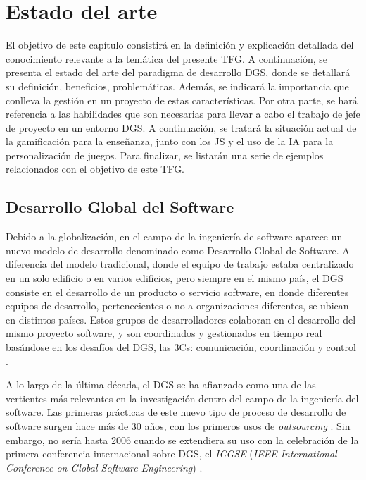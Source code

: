 \chapter{Estado del arte}
\label{cap:Antecedentes}

El objetivo de este capítulo consistirá en la definición y explicación detallada del conocimiento relevante a la temática del presente TFG. A continuación, se presenta el estado del arte del paradigma de desarrollo DGS, donde se detallará su definición, beneficios, problemáticas. Además, se indicará la importancia que conlleva la gestión en un proyecto de estas características. Por otra parte, se hará referencia a las habilidades que son necesarias para llevar a cabo el trabajo de jefe de proyecto en un entorno DGS. A continuación, se tratará la situación actual de la gamificación para la enseñanza, junto con los JS y el uso de la IA para la personalización de juegos. Para finalizar, se listarán una serie de ejemplos relacionados con el objetivo de este TFG.

\section{Desarrollo Global del Software}
\label{sec:DGS}

Debido a la globalización, en el campo de la ingeniería de software aparece un nuevo modelo de desarrollo denominado como Desarrollo Global de Software. A diferencia del modelo tradicional, donde el equipo de trabajo estaba centralizado en un solo edificio o en varios edificios, pero siempre en el mismo país, el DGS consiste en el desarrollo de un producto o servicio software, en donde diferentes equipos de desarrollo, pertenecientes o no a organizaciones diferentes, se ubican en distintos países. Estos grupos de desarrolladores colaboran en el desarrollo del mismo proyecto software, y son coordinados y gestionados en tiempo real basándose en los desafíos del DGS, las 3Cs: comunicación, coordinación y control \cite{piattini2014desarrollo}.

A lo largo de la última década, el DGS se ha afianzado como una de las vertientes más relevantes en la investigación dentro del campo de la ingeniería del software. Las primeras prácticas de este nuevo tipo de proceso de desarrollo de software surgen hace más de 30 años, con los primeros usos de \emph{outsourcing} \cite{boehm2006view}. Sin embargo, no sería hasta 2006 cuando se extendiera su uso con la celebración de la primera conferencia internacional sobre DGS, el \emph{ICGSE} (\emph{IEEE International Conference on Global Software Engineering}) \cite{piattini2014desarrollo, vizcaino2015vision}.

